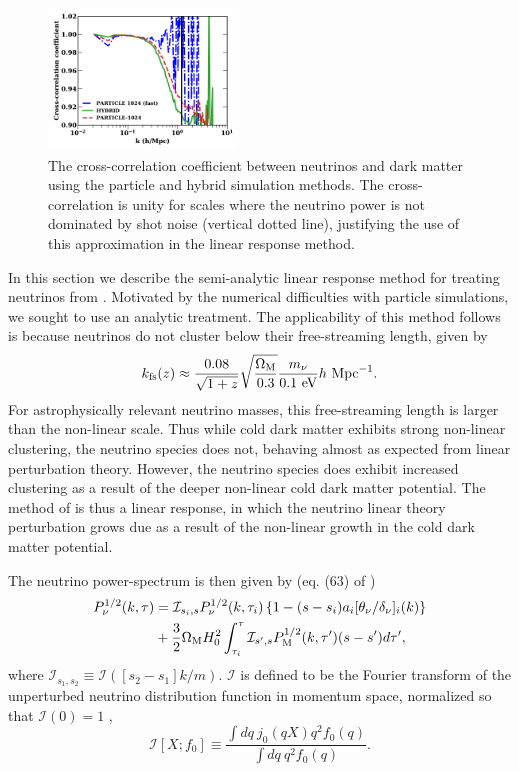 \documentclass[useAMS, usenatbib]{mnras}
\begin{document}
\begin{figure}
\includegraphics[width=0.45\textwidth]{nuplots/corr_coeff-1.pdf}
  \caption{The cross-correlation coefficient between neutrinos and dark matter using the particle and hybrid simulation methods.
  The cross-correlation is unity for scales where the neutrino power is not dominated by shot noise (vertical dotted line), justifying the use of
  this approximation in the linear response method.
  }
  \label{fig:cross-corr}
\end{figure}

In this section we describe the semi-analytic linear response method for treating neutrinos from \cite{AHB}.
Motivated by the numerical difficulties with particle simulations, we sought to use an analytic treatment.
The applicability of this method follows is because neutrinos do not cluster below their free-streaming length, given by
\begin{equation}
 k_{\rm fs}(z) \approx \frac{0.08}{\sqrt{1+z}}
\sqrt{\frac{\Omega_{\rm M}}{0.3}} \frac{m_{\nu}}{0.1 ~ \textrm{eV}} h~ \textrm{Mpc}^{-1}.  \label{eq:kfs}
\end{equation}
For astrophysically relevant neutrino masses, this free-streaming length is larger than the non-linear scale.
Thus while cold dark matter exhibits strong non-linear clustering, the neutrino species does not, behaving
almost as expected from linear perturbation theory. However, the neutrino species does exhibit increased clustering
as a result of the deeper non-linear cold dark matter potential. The method of \cite{AHB} is thus a linear response,
in which the neutrino linear theory perturbation grows due as a result of the non-linear growth in the cold dark matter potential.

The neutrino power-spectrum is then given by (eq. (63) of \cite{AHB})
\begin{align}
P_{\nu}^{1/2}(k, \tau) &= \mathcal{I}_{s_i, s}
P_{\nu}^{1/2}(k, \tau_i) \left\{1 - (s - s_i)  a_i [\theta_{\nu}/\delta_{\nu}]_{i}(k)\right\}\nonumber\\
&+ \frac32 \Omega_{\rm M} H_0^2 \int_{\tau_i}^{\tau} \mathcal{I}_{s', s}
P^{1/2}_{\rm M}(k, \tau') (s - s')d \tau', \label{eq:P-final}
\end{align}
where $\mathcal{I}_{s_1, s_2} \equiv \mathcal{I}([s_2 -s_1]k/m)$. $\mathcal{I}$ is defined to be
the Fourier transform of the unperturbed neutrino distribution function in momentum space, normalized so
that $\mathcal{I}(0) = 1$ \citep{Brandenberger_1987, Bertschinger_Watts_1988},
\begin{equation}
\mathcal{I}[X; f_0] \equiv \frac{\int dq~ j_0(q X) q^2 f_0(q) }{\int dq ~q^2 f_0(q)}. \label{eq:I.def}
\end{equation}
\end{document}
